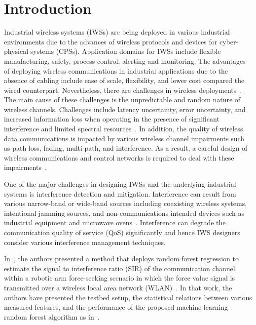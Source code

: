 	\section{Introduction} \label{ftml:sec:intro}    
	Industrial wireless systems (IWSs) are being deployed in various industrial environments due to the advances of wireless protocols and devices for cyber-physical systems (CPSs). Application domains for IWSs include flexible manufacturing, safety, process control, alerting and monitoring\cite{Candell2018.IWSGuide}. The advantages of deploying wireless communications in industrial applications due to the absence of cabling include ease of scale, flexibility, and lower cost compared the wired counterpart. Nevertheless, there are challenges in wireless deployments~\cite{Sisinni2018,Bello2017,Pang2017.WirelessChallenges}. The main cause of these challenges is the unpredictable and random nature of wireless channels. Challenges include latency uncertainty, error uncertainty, and  increased information loss when operating in the presence of significant interference and limited spectral resources~\cite{Candell2017.SAS.IWSWorkshopReport}. In addition, the quality of wireless data communications is impacted by various wireless channel impairments such as path loss, fading, multi-path, and interference. As a result, a careful design of wireless communications and control networks is required to deal with these impairments~\cite{Lu2016.WirelessCPS,Kim2017.WirelessCodesign}.    
    
    One of the major challenges in designing IWSs and the underlying industrial systems is interference detection and mitigation. Interference can result from various narrow-band or wide-band sources including  coexisting wireless systems, intentional jamming sources, and non-communications intended devices such as industrial equipment and microwave ovens~\cite{Chiwewe2015.Survey.CR.Intf}. Interference can degrade the communication quality of service (QoS) significantly and hence IWS designers consider various interference management techniques.   

    In~\cite{Candell_ISIT_2019}, the authors presented a method that deploys random forest regression to estimate the signal to interference ratio (SIR) of the communication channel within a robotic arm force-seeking scenario in which the force value signal is transmitted over a wireless local area network (WLAN)~\cite{IEEE802.11ac}. In that work, the authors have presented the testbed setup, the statistical relations between various measured features, and the performance of the proposed machine learning random forest algorithm as in~\cite{Candell_ISIT_2019}.  
    
